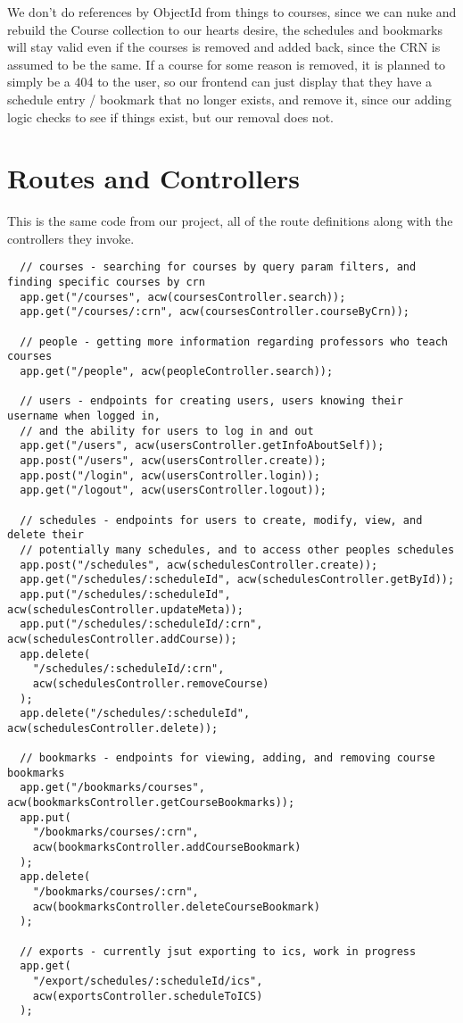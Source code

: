\documentclass[12pt]{article}
\begin{document}
    We don't do references by ObjectId from things to courses, since we can nuke and rebuild the Course collection to our hearts desire, the schedules and bookmarks will stay valid even if the courses is removed and added back, since the CRN is assumed to be the same.  If a course for some reason is removed, it is planned to simply be a 404 to the user, so our frontend can just display that they have a schedule entry / bookmark that no longer exists, and remove it, since our adding logic checks to see if things exist, but our removal does not.
    
\section{Routes and Controllers}

This is the same code from our project, all of the route definitions along with the controllers they invoke.

\begin{lstlisting}
  // courses - searching for courses by query param filters, and finding specific courses by crn
  app.get("/courses", acw(coursesController.search));
  app.get("/courses/:crn", acw(coursesController.courseByCrn));

  // people - getting more information regarding professors who teach courses
  app.get("/people", acw(peopleController.search));

  // users - endpoints for creating users, users knowing their username when logged in,
  // and the ability for users to log in and out
  app.get("/users", acw(usersController.getInfoAboutSelf));
  app.post("/users", acw(usersController.create));
  app.post("/login", acw(usersController.login));
  app.get("/logout", acw(usersController.logout));

  // schedules - endpoints for users to create, modify, view, and delete their
  // potentially many schedules, and to access other peoples schedules
  app.post("/schedules", acw(schedulesController.create));
  app.get("/schedules/:scheduleId", acw(schedulesController.getById));
  app.put("/schedules/:scheduleId", acw(schedulesController.updateMeta));
  app.put("/schedules/:scheduleId/:crn", acw(schedulesController.addCourse));
  app.delete(
    "/schedules/:scheduleId/:crn",
    acw(schedulesController.removeCourse)
  );
  app.delete("/schedules/:scheduleId", acw(schedulesController.delete));

  // bookmarks - endpoints for viewing, adding, and removing course bookmarks
  app.get("/bookmarks/courses", acw(bookmarksController.getCourseBookmarks));
  app.put(
    "/bookmarks/courses/:crn",
    acw(bookmarksController.addCourseBookmark)
  );
  app.delete(
    "/bookmarks/courses/:crn",
    acw(bookmarksController.deleteCourseBookmark)
  );

  // exports - currently jsut exporting to ics, work in progress
  app.get(
    "/export/schedules/:scheduleId/ics",
    acw(exportsController.scheduleToICS)
  );
\end{lstlisting}
\end{document}
